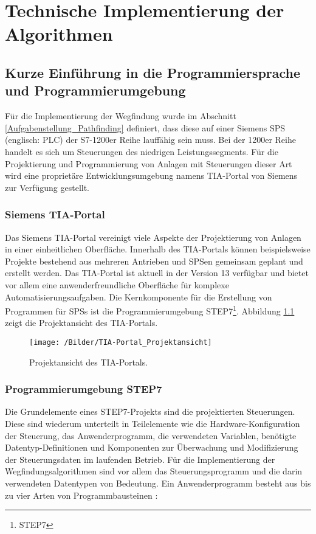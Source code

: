 \chapter{Technische Implementierung der Algorithmen}
	\label{Implementierung}
	\section{Kurze Einführung in die Programmiersprache und Programmierumgebung}
	
		Für die Implementierung der Wegfindung wurde im Abschnitt \ref{Aufgabenstellung_Pathfinding} definiert, dass diese auf einer Siemens \ac{SPS} (englisch: \ac{PLC})  der S7-1200er Reihe lauffähig sein muss. Bei der 1200er Reihe handelt es sich um  Steuerungen des niedrigen Leistungssegments. Für die Projektierung und Programmierung von Anlagen mit Steuerungen dieser Art wird eine proprietäre Entwicklungsumgebung namens \ac{TIA-Portal} von Siemens zur Verfügung gestellt.
		
		\subsection{Siemens TIA-Portal}
		
			Das Siemens \ac{TIA-Portal} vereinigt viele Aspekte der Projektierung von Anlagen in einer einheitlichen Oberfläche. Innerhalb des \ac{TIA-Portal}s können beispielsweise Projekte bestehend aus mehreren Antrieben und \ac{SPS}en gemeinsam geplant und erstellt werden. Das  \ac{TIA-Portal} ist aktuell in der Version 13 verfügbar und bietet vor allem eine anwenderfreundliche Oberfläche für komplexe Automatisierungsaufgaben. Die Kernkomponente für die Erstellung von Programmen für \aclp{SPS} ist die Programmierumgebung \acs{STEP7}\footnote{\ac{STEP7}}. Abbildung \ref{Projektansicht} zeigt die Projektansicht des \ac{TIA-Portal}s.
			
			\begin{figure}
				\centering
				\texttt{[image: /Bilder/TIA-Portal\_Projektansicht]}
				\vspace{0.2cm}
				\caption{Projektansicht des \ac{TIA-Portal}s.}\label{Projektansicht}
			\end{figure}
			
		
		\subsection{Programmierumgebung STEP7}
			Die Grundelemente eines \ac{STEP7}-Projekts sind die projektierten Steuerungen. Diese sind wiederum unterteilt in Teilelemente wie die Hardware-Konfiguration der Steuerung, das Anwenderprogramm, die verwendeten Variablen, benötigte Datentyp-Definitionen und Komponenten zur Überwachung und Modifizierung der Steuerungsdaten im laufenden Betrieb. Für die Implementierung der Wegfindungsalgorithmen sind vor allem das Steuerungsprogramm und die darin verwendeten Datentypen von Bedeutung. Ein Anwenderprogramm besteht aus bis zu vier Arten von Programmbausteinen \cite{STEP7Prog}:\\
					
